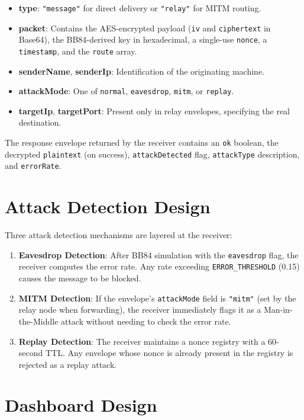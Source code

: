 \begin{itemize}
    \item \textbf{type}: \texttt{"message"} for direct delivery or \texttt{"relay"} for MITM routing.
    \item \textbf{packet}: Contains the AES-encrypted payload (\texttt{iv} and \texttt{ciphertext} in Base64), the BB84-derived key in hexadecimal, a single-use \texttt{nonce}, a \texttt{timestamp}, and the \texttt{route} array.
    \item \textbf{senderName}, \textbf{senderIp}: Identification of the originating machine.
    \item \textbf{attackMode}: One of \texttt{normal}, \texttt{eavesdrop}, \texttt{mitm}, or \texttt{replay}.
    \item \textbf{targetIp}, \textbf{targetPort}: Present only in relay envelopes, specifying the real destination.
\end{itemize}

The response envelope returned by the receiver contains an \texttt{ok} boolean, the decrypted \texttt{plaintext} (on success), \texttt{attackDetected} flag, \texttt{attackType} description, and \texttt{errorRate}.

\section{Attack Detection Design}

Three attack detection mechanisms are layered at the receiver:

\begin{enumerate}
    \item \textbf{Eavesdrop Detection}: After BB84 simulation with the \texttt{eavesdrop} flag, the receiver computes the error rate. Any rate exceeding \texttt{ERROR\_THRESHOLD} (0.15) causes the message to be blocked.
    \item \textbf{MITM Detection}: If the envelope's \texttt{attackMode} field is \texttt{"mitm"} (set by the relay node when forwarding), the receiver immediately flags it as a Man-in-the-Middle attack without needing to check the error rate.
    \item \textbf{Replay Detection}: The receiver maintains a nonce registry with a 60-second TTL. Any envelope whose nonce is already present in the registry is rejected as a replay attack.
\end{enumerate}

\section{Dashboard Design}


